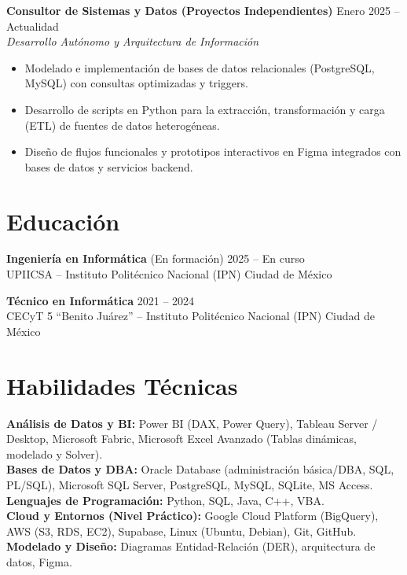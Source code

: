 \documentclass[10pt,letterpaper]{article}
\begin{document}
\textbf{Consultor de Sistemas y Datos (Proyectos Independientes)} \hfill Enero 2025 -- Actualidad\\
\textit{Desarrollo Autónomo y Arquitectura de Información}
\begin{itemize}[leftmargin=12pt, itemsep=0pt, topsep=1pt, parsep=0pt]
    \item Modelado e implementación de bases de datos relacionales (PostgreSQL, MySQL) con consultas optimizadas y triggers.
    \item Desarrollo de scripts en Python para la extracción, transformación y carga (ETL) de fuentes de datos heterogéneas.
    \item Diseño de flujos funcionales y prototipos interactivos en Figma integrados con bases de datos y servicios backend.
\end{itemize}

\section{Educación}

\textbf{Ingeniería en Informática} (En formación) \hfill 2025 -- En curso\\
UPIICSA -- Instituto Politécnico Nacional (IPN) \hfill Ciudad de México

\textbf{Técnico en Informática} \hfill 2021 -- 2024\\
CECyT 5 ``Benito Juárez'' -- Instituto Politécnico Nacional (IPN) \hfill Ciudad de México

\section{Habilidades Técnicas}

\textbf{Análisis de Datos y BI:} Power BI (DAX, Power Query), Tableau Server / Desktop, Microsoft Fabric, Microsoft Excel Avanzado (Tablas dinámicas, modelado y Solver).\\
\textbf{Bases de Datos y DBA:} Oracle Database (administración básica/DBA, SQL, PL/SQL), Microsoft SQL Server, PostgreSQL, MySQL, SQLite, MS Access.\\
\textbf{Lenguajes de Programación:} Python, SQL, Java, C++, VBA.\\
\textbf{Cloud y Entornos (Nivel Práctico):} Google Cloud Platform (BigQuery), AWS (S3, RDS, EC2), Supabase, Linux (Ubuntu, Debian), Git, GitHub.\\
\textbf{Modelado y Diseño:} Diagramas Entidad-Relación (DER), arquitectura de datos, Figma.
\end{document}
